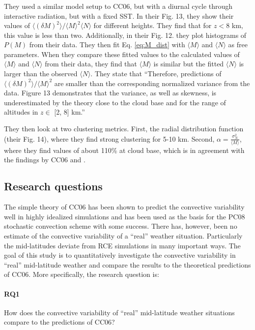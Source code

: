\documentclass[a4paper, 12pt]{article}
\begin{document}
\subsubsection{\cite{Davoudi2010}}
They used a similar model setup to CC06, but with a diurnal cycle through interactive radiation, but with a fixed SST. In their Fig. 13, they show their values of $\langle (\delta M)^2 \rangle/\langle M \rangle^2 \langle N \rangle$ for different heights. They find that for $z <$8 km, this value is less than two. Additionally, in their Fig. 12. they plot histograms of $P(M)$ from their data. They then fit Eq. \ref{eq:M_dist} with $\langle M \rangle$ and $\langle N \rangle$ as free parameters. When they compare these fitted values to the calculated values of $\langle M \rangle$ and $\langle N \rangle$ from their data, they find that $\langle M \rangle$  is similar but the fitted $\langle N \rangle$ is larger than the observed $\langle N \rangle$. They state that ``Therefore, predictions of $\langle (\delta M)^2 \rangle/\langle M \rangle^2$ are smaller than the corresponding normalized variance from the data. Figure 13 demonstrates that the variance, as well as skewness, is underestimated by the theory close to the cloud base and for the range of altitudes in $z \in$  [2, 8] km.''

They then look at two clustering metrics. First, the radial distribution function (their Fig. 14), where they find strong clustering for 5-10 km. Second, $\alpha = \frac{\sigma_N^2}{\langle M \rangle}$, where they find values of about 110\% at cloud base, which is in agreement with the findings by CC06 and \cite{Davies2008}. 

\subsection{Research questions}
The simple theory of CC06 has been shown to predict the convective variability well in highly idealized simulations and has been used as the basis for the PC08 stochastic convection scheme with some success. There has, however, been no estimate of the convective variability of a ``real'' weather situation. Particularly the mid-latitudes deviate from RCE simulations in many important ways. The goal of this study is to quantitatively investigate the convective variability in ``real'' mid-latitude weather and compare the results to the theoretical predictions of CC06. More specifically, the research question is:

\paragraph{RQ1} How does the convective variability of ``real'' mid-latitude weather situations compare to the predictions of CC06?
\end{document}
